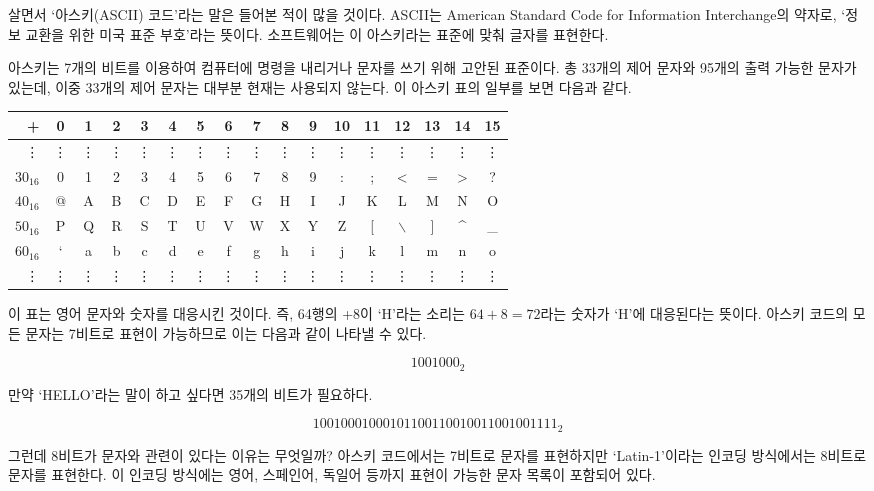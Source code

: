 \documentclass{article}
\begin{document}
살면서 `아스키(ASCII) 코드'라는 말은 들어본 적이 많을 것이다. ASCII는 American Standard
Code for Information Interchange의 약자로, `정보 교환을 위한 미국 표준 부호'라는 뜻이다.
소프트웨어는 이 아스키라는 표준에 맞춰 글자를 표현한다.

아스키는 7개의 비트를 이용하여 컴퓨터에 명령을 내리거나 문자를 쓰기 위해 고안된 표준이다.
총 33개의 제어 문자와 95개의 출력 가능한 문자가 있는데, 이중 33개의 제어 문자는 대부분 현재는
사용되지 않는다. 이 아스키 표의 일부를 보면 다음과 같다.

\begin{center}
    \begin{tabular}{r|cccccccccccccccc}
        + & 0 & 1 & 2 & 3 & 4 & 5 & 6 & 7 & 8 & 9 & 10 & 11 & 12 & 13 & 14 & 15 \\
        \hline
        \vdots & \vdots & \vdots & \vdots & \vdots & \vdots & \vdots & \vdots & \vdots & \vdots & \vdots & \vdots & \vdots & \vdots & \vdots & \vdots & \vdots \\
        $30_{16}$ & 0 & 1 & 2 & 3 & 4 & 5 & 6 & 7 & 8 & 9 & : & ; & < & = & > & ? \\
        $40_{16}$ & @ & A & B & C & D & E & F & G & H & I & J & K & L & M & N & O \\
        $50_{16}$ & P & Q & R & S & T & U & V & W & X & Y & Z & [ & $\backslash$ & ] & \^{} & \_{} \\
        $60_{16}$ & ` & a & b & c & d & e & f & g & h & i & j & k & l & m & n & o \\
        \vdots & \vdots & \vdots & \vdots & \vdots & \vdots & \vdots & \vdots & \vdots & \vdots & \vdots & \vdots & \vdots & \vdots & \vdots & \vdots & \vdots
    \end{tabular}
\end{center}

이 표는 영어 문자와 숫자를 대응시킨 것이다. 즉, 64행의 +8이 `H'라는 소리는 $64+8 = 72$라는
숫자가 `H'에 대응된다는 뜻이다. 아스키 코드의 모든 문자는 7비트로 표현이 가능하므로 이는 다음과
같이 나타낼 수 있다.

$$
1001000_2
$$

만약 `HELLO'라는 말이 하고 싶다면 35개의 비트가 필요하다.

$$
1001000 1000101 1001100 1001100 1001111 _2
$$

그런데 8비트가 문자와 관련이 있다는 이유는 무엇일까?
아스키 코드에서는 7비트로 문자를 표현하지만 `Latin-1'이라는 인코딩 방식에서는 8비트로 문자를
표현한다. 이 인코딩 방식에는 영어, 스페인어, 독일어 등까지 표현이 가능한 문자 목록이 포함되어
있다.
\end{document}
